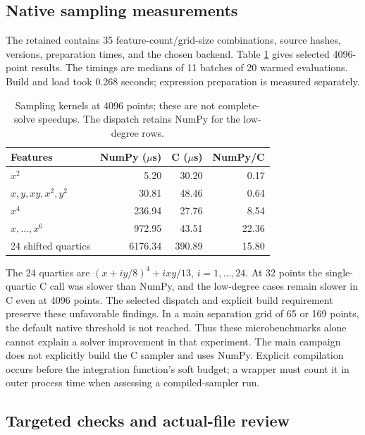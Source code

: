 \subsection{Native sampling measurements}

The retained
contains 35 feature-count/grid-size combinations, source hashes,
versions, preparation times, and the chosen backend. Table
\ref{tab:native} gives selected 4096-point results. The timings are
medians of 11 batches of 20 warmed evaluations. Build and load took
0.268 seconds; expression preparation is measured separately.

\begin{table}[ht]
\centering
\begin{tabular}{lrrr}
\toprule
Features & NumPy ($\mu$s) & C ($\mu$s) & NumPy/C \\
\midrule
$x^2$ & 5.20 & 30.20 & 0.17\\
$x,y,xy,x^2,y^2$ & 30.81 & 48.46 & 0.64\\
$x^4$ & 236.94 & 27.76 & 8.54\\
$x,\ldots,x^6$ & 972.95 & 43.51 & 22.36\\
24 shifted quartics & 6176.34 & 390.89 & 15.80\\
\bottomrule
\end{tabular}
\caption{Sampling kernels at 4096 points; these are not complete-solve
speedups. The dispatch retains NumPy for the low-degree rows.}
\label{tab:native}
\end{table}

The 24 quartics are $(x+iy/8)^4+ixy/13$, $i=1,\ldots,24$.
At 32 points the single-quartic C call was slower than NumPy, and
the low-degree cases remain slower in C even at 4096 points. The
selected dispatch and explicit build requirement preserve these
unfavorable findings. In a main separation grid of 65 or 169 points,
the default native threshold is not reached. Thus these microbenchmarks
alone cannot explain a solver improvement in that experiment.
The main campaign does not explicitly build the C sampler and uses
NumPy. Explicit compilation occurs before the integration function's
soft budget; a wrapper must count it in outer process time when
assessing a compiled-sampler run.

\subsection{Targeted checks and actual-file review}

